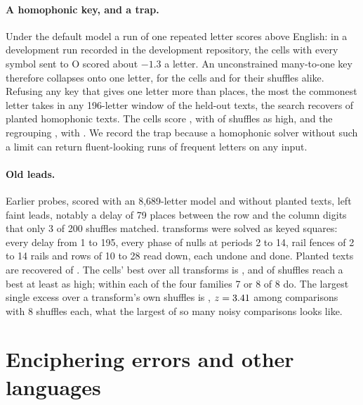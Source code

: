 \documentclass[11pt]{article}
\theoremstyle{definition}
\begin{document}
\paragraph{A homophonic key, and a trap.} Under the default model a run of one repeated letter scores above English: in a development run recorded in the development repository, the cells with every symbol sent to O scored about $-1.3$ a letter. An unconstrained many-to-one key therefore collapses onto one letter, for the cells and for their shuffles alike. Refusing any key that gives one letter more than \homCap{} places, the most the commonest letter takes in any 196-letter window of the held-out texts, the search recovers \homRecovered{} of \homPlanted{} planted homophonic texts. The cells score \homCells{}, with \homCellsAsHigh{} of \homShuffles{} shuffles as high, and the regrouping \homRegrouped{}, with \homRegroupedAsHigh{}. We record the trap because a homophonic solver without such a limit can return fluent-looking runs of frequent letters on any input.

\paragraph{Old leads.} Earlier probes, scored with an 8,689-letter model and without planted texts, left faint leads, notably a delay of 79 places between the row and the column digits that only 3 of 200 shuffles matched. \dirTransforms{} transforms were solved as keyed squares: every delay from 1 to 195, every phase of nulls at periods 2 to 14, rail fences of 2 to 14 rails and rows of 10 to 28 read down, each undone and done. Planted texts are recovered \dirRecovered{} of \dirPlanted{}. The cells' best over all transforms is \dirBest{}, and \dirAsHigh{} of \dirShuffles{} shuffles reach a best at least as high; within each of the four families 7 or 8 of 8 do. The largest single excess over a transform's own shuffles is \dirTopTransform{}, $z = 3.41{}$ among \dirTransforms{} comparisons with 8 shuffles each, what the largest of so many noisy comparisons looks like.

\section{Enciphering errors and other languages}\label{sec:errors}
\end{document}
